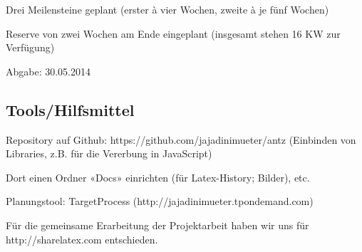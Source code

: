 \documentclass{article}
\begin{document}
\begin{compactitem}
\item Drei Meilensteine geplant (erster à vier Wochen, zweite à je fünf Wochen)
\item Reserve von zwei Wochen am Ende eingeplant (insgesamt stehen 16 KW zur Verfügung)
\item Abgabe: 30.05.2014
\end{compactitem}


\vspace*{1cm}


\subsection*{Tools/Hilfsmittel}

\begin{compactitem}
\item Repository auf Github: https://github.com/jajadinimueter/antz (Einbinden von Libraries, z.B. für die Vererbung in JavaScript)
\item [Dort einen Ordner «Docs» einrichten (für Latex-History; Bilder), etc.]
\item Planungstool: TargetProcess (http://jajadinimueter.tpondemand.com)
\item Für die gemeinsame Erarbeitung der Projektarbeit haben wir uns für http://sharelatex.com entschieden.
\end{compactitem}
\end{document}
